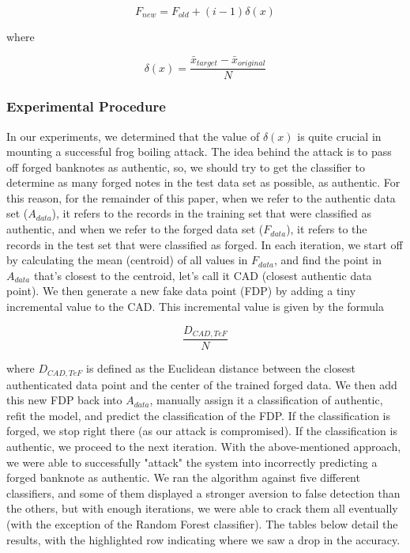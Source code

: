 \documentclass{article}
\begin{document}
\begin{equation}
F_{new} = F_{old} + (i - 1)\delta(x)
\end{equation}

where

\begin{equation}
\delta(x) = \frac{\bar{x}_{target}-\bar{x}_{original}}{N}
\end{equation}

\subsubsection{Experimental Procedure}

In our experiments, we determined that the value of $\delta(x)$ is quite crucial in mounting a successful frog boiling attack. The idea behind the attack is to pass off forged banknotes as authentic, so, we should try to get the classifier to determine as many forged notes in the test data set as possible, as authentic. For this reason, for the remainder of this paper, when we refer to the authentic data set ($A_{data}$), it refers to the records in the training set that were classified as authentic, and when we refer to the forged data set ($F_{data}$), it refers to the records in the test set that were classified as forged.
\newline
\newline
In each iteration, we start off by calculating the mean (centroid) of all values in $F_{data}$, and find the point in $A_{data}$ that’s closest to the centroid, let’s call it CAD (closest authentic data point). We then generate a new fake data point (FDP) by adding a tiny incremental value to the CAD. This incremental value is given by the formula

\begin{equation}
\frac{D_{CAD,TeF}}{N}
\end{equation}

where $D_{CAD, TeF}$ is defined as the Euclidean distance between the closest authenticated data point and the center of the trained forged data.
\newline
We then add this new FDP back into $A_{data}$, manually assign it a classification of authentic, refit the model, and predict the classification of the FDP. If the classification is forged, we stop right there (as our attack is compromised). If the classification is authentic, we proceed to the next iteration.
\newline\newline
With the above-mentioned approach, we were able to successfully "attack" the system into incorrectly predicting a forged banknote as authentic. We ran the algorithm against five different classifiers, and some of them displayed a stronger aversion to false detection than the others, but with enough iterations, we were able to crack them all eventually (with the exception of the Random Forest classifier). The tables below detail the results, with the highlighted row indicating where we saw a drop in the accuracy.
\end{document}
